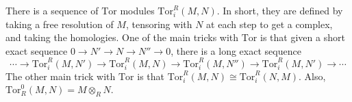 \documentclass[12pt]{amsart}
\begin{document}
There is a sequence of $\mathrm{Tor}$ modules $\mathrm{Tor}_i^R(M,N)$. In short, they are defined by taking a free resolution of $M$, tensoring with $N$ at each step to get a complex, and taking the homologies.
One of the main tricks with $\mathrm{Tor}$ is that given a short exact sequence ${0\to N' \to N \to N'' \to 0}$, there is a long exact sequence
\[ \cdots \to \mathrm{Tor}_i^R(M,N') \to \mathrm{Tor}_i^R(M,N) \to \mathrm{Tor}_i^R(M,N'') \to \mathrm{Tor}_i^R(M,N') \to \cdots\]
The other main trick with $\mathrm{Tor}$ is that $\mathrm{Tor}_i^R(M,N)\cong \mathrm{Tor}_i^R(N,M)$.
Also, $\mathrm{Tor}^0_R(M,N)=M\otimes_R N$.


	
\end{document}
